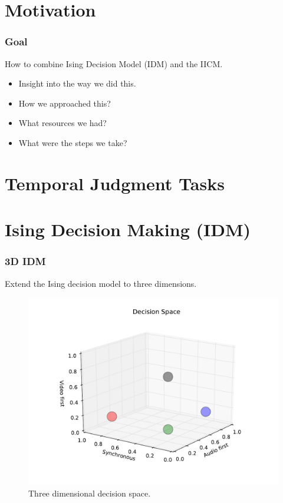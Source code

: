 \documentclass[xcolor={fixpdftex,hyperref,x11names},10pt,pdftex,hyperref={pdftex}]{beamer}
\begin{document}
\section{Motivation}
\label{sec:motivation}

\begin{frame}
  \frametitle{Goal}
  How to combine Ising Decision Model (IDM) and the IICM.

  \begin{itemize}
      \item Insight into the way we did this.
      \item How we approached this?
      \item What resources we had?
      \item What were the steps we take?
  \end{itemize}
\end{frame}

\section{Temporal Judgment Tasks}
\label{sec:tjt}





\section{Ising Decision Making (IDM)}
\label{sec:idm}



\begin{frame}
  \frametitle{3D IDM}
  Extend the Ising decision model to three dimensions.

  \begin{figure}[h]
    \centering
    \includegraphics[width=\textwidth]{./figs/decision_space_3d.pdf}
    \caption{Three dimensional decision space.}
    \label{fig:3dspace}
  \end{figure}
\end{frame}
\end{document}
